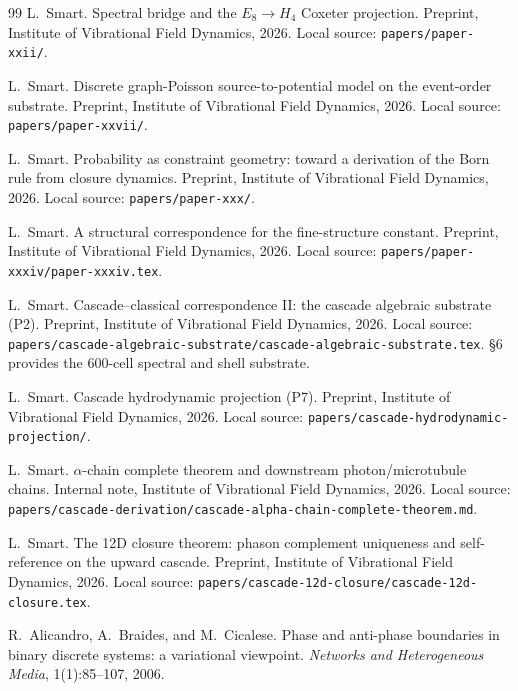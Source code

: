 \documentclass[11pt]{article}
\theoremstyle{definition}
\begin{document}
\begin{thebibliography}{99}
L.~Smart.
\newblock Spectral bridge and the $E_8 \to H_4$ Coxeter projection.
\newblock Preprint, Institute of Vibrational Field Dynamics, 2026.
\newblock Local source: \texttt{papers/paper-xxii/}.

L.~Smart.
\newblock Discrete graph-Poisson source-to-potential model on the event-order substrate.
\newblock Preprint, Institute of Vibrational Field Dynamics, 2026.
\newblock Local source: \texttt{papers/paper-xxvii/}.

L.~Smart.
\newblock Probability as constraint geometry: toward a derivation of the Born rule from closure dynamics.
\newblock Preprint, Institute of Vibrational Field Dynamics, 2026.
\newblock Local source: \texttt{papers/paper-xxx/}.

L.~Smart.
\newblock A structural correspondence for the fine-structure constant.
\newblock Preprint, Institute of Vibrational Field Dynamics, 2026.
\newblock Local source: \texttt{papers/paper-xxxiv/paper-xxxiv.tex}.

L.~Smart.
\newblock Cascade--classical correspondence II: the cascade algebraic substrate ({P2}).
\newblock Preprint, Institute of Vibrational Field Dynamics, 2026.
\newblock Local source: \texttt{papers/cascade-algebraic-substrate/cascade-algebraic-substrate.tex}. \S 6 provides the 600-cell spectral and shell substrate.

L.~Smart.
\newblock Cascade hydrodynamic projection ({P7}).
\newblock Preprint, Institute of Vibrational Field Dynamics, 2026.
\newblock Local source: \texttt{papers/cascade-hydrodynamic-projection/}.

L.~Smart.
\newblock $\alpha$-chain complete theorem and downstream photon/microtubule chains.
\newblock Internal note, Institute of Vibrational Field Dynamics, 2026.
\newblock Local source: \texttt{papers/cascade-derivation/cascade-alpha-chain-complete-theorem.md}.

L.~Smart.
\newblock The 12D closure theorem: phason complement uniqueness and self-reference on the upward cascade.
\newblock Preprint, Institute of Vibrational Field Dynamics, 2026.
\newblock Local source: \texttt{papers/cascade-12d-closure/cascade-12d-closure.tex}.

R.~Alicandro, A.~Braides, and M.~Cicalese.
\newblock Phase and anti-phase boundaries in binary discrete systems: a variational viewpoint.
\newblock \emph{Networks and Heterogeneous Media}, 1(1):85--107, 2006.

\end{thebibliography}
\end{document}
